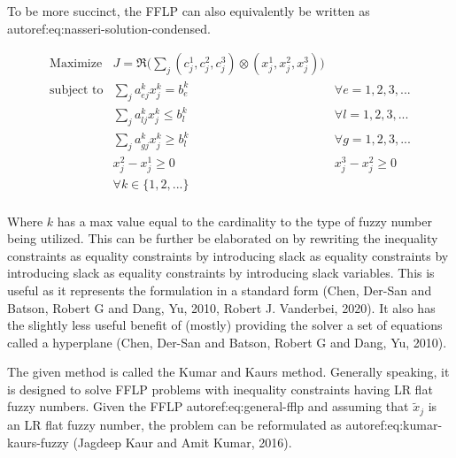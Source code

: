 \documentclass[11pt,a4paper,final]{article}
\begin{document}
\noindent
To be more succinct, the FFLP can also equivalently be written as autoref:eq:nasseri-solution-condensed.

\begin{equation}
\label{eq:nasseri-solution-condensed}
\begin{array}{lll}
\text{Maximize}   & J = \mathfrak{R}\Big(\sum_j (c_j^1,c_j^2,c_j^3) \otimes (x_j^1,x_j^2,x_j^3)\Big) &\\
\text{subject to} & \sum_j a_{ej}^k x_j^k = b_e^k &  \forall e = 1,2,3,... \\
                  & \sum_j a_{lj}^k x_j^k \le b_l^k &  \forall l = 1,2,3,... \\
                  & \sum_j a_{gj}^k x_j^k \ge b_l^k  &  \forall g = 1,2,3,... \\
                  & x_j^2 - x_j^1 \ge 0         & x_j^3 - x_j^2 \ge 0 \\
                  & \forall k \in \{1,2,...\}        &                  \\
\end{array}
\end{equation}

Where \(k\) has a max value equal to the cardinality to the type of fuzzy number being utilized. This can be further be
elaborated on by rewriting the inequality constraints as equality constraints by introducing slack as equality
constraints by introducing slack as equality constraints by introducing slack variables. This is useful as it
represents the formulation in a standard form (Chen, Der-San and Batson, Robert G and Dang, Yu, 2010, Robert J. Vanderbei, 2020). It also has the
slightly less useful benefit of (mostly) providing the solver a set of equations called a hyperplane (Chen, Der-San and Batson, Robert G and Dang, Yu, 2010).

The given method is called the Kumar and Kaurs method. Generally speaking, it is designed to solve FFLP problems with
inequality constraints having LR flat fuzzy numbers. Given the FFLP autoref:eq:general-fflp and assuming that
\(\tilde{x}_j\) is an LR flat fuzzy number, the problem can be reformulated as autoref:eq:kumar-kaurs-fuzzy
(Jagdeep Kaur and Amit Kumar, 2016).
\end{document}
